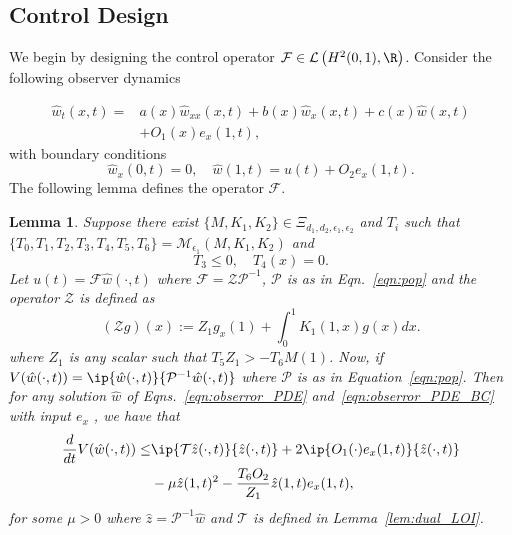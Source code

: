 \documentclass[US letter, 9 pt, conference]{ieeeconf}  \usepackage{setspace}
\newtheorem{lemma}{Lemma}
\newcommand{\igzo}{\int_0^1}
\newcommand{\wh}{\hat{w}}
\newcommand{\mcl}[1]{\mathcal{#1}}
\newcommand{\pop}{\mathcal{P}}
\newcommand{\pinv}{\mathcal{P}^{-1}}
\newcommand{\zh}{\hat{z}}
\begin{document}
\subsection{Control Design}
We begin by designing the control operator $\mcl{F} \in \mcl{L}\left(H^2(0,1),\R \right)$. Consider the following observer dynamics

\begin{align}
\wh_t(x,t)=&a(x)\wh_{xx}(x,t)+b(x)\wh_x(x,t)+c(x)\wh(x,t) \nonumber \\
&\label{eqn:obserror_PDE} +O_1(x)e_x(1,t),
\end{align}
with boundary conditions
\begin{equation}\label{eqn:obserror_PDE_BC}
\wh_x(0,t)=0, \quad \wh(1,t)=u(t)+O_2 e_x(1,t).
\end{equation} The following lemma defines the operator $\mcl{F}$.
\begin{lemma}\label{lem:control}
Suppose there exist $\{M,K_1,K_2\} \in \Xi_{d_1,d_2,\epsilon_1,\epsilon_2}$ and $T_i$ such that
$\{T_0,T_1,T_2,T_3,T_4,T_5,T_6\}=\mcl{M}_{\epsilon_1}\left(M,K_1,K_2\right)$ and
\[
 T_3 \leq 0, \quad  T_4(x)=0.
\]
Let $u(t)=\mcl{F}\wh(\cdot,t)$ where $\mcl{F}=\mcl{Z}\pinv$, $\pop$ is as in Eqn.~\eqref{eqn:pop} and the operator $\mcl{Z}$ is defined as
\[
\left(\mcl{Z}g \right)(x):=Z_1 g_x(1)+\igzo K_1(1,x)g(x)dx.
\]
where $Z_1$ is any scalar such that $T_5 Z_1> -T_6 M(1)$.
Now, if $V(\wh(\cdot,t))=\ip{\wh(\cdot,t)}{\pinv \wh(\cdot,t)}$ where $\pop$ is as in Equation~\eqref{eqn:pop}. Then for any solution $\wh$ of Eqns.~\eqref{eqn:obserror_PDE} and~\eqref{eqn:obserror_PDE_BC} with input $e_x$ , we have that
\begin{align*}
\frac{d}{dt}V(\wh(\cdot,t)) \leq & \ip{\mcl{T}\zh(\cdot,t)}{\zh(\cdot,t)}+2 \ip{O_1(\cdot)e_x(1,t)}{\zh(\cdot,t)} \\
& -\mu \zh(1,t)^2 -\frac{T_6 O_2}{Z_1}\zh(1,t)e_x(1,t),
\end{align*}
for some $\mu>0$ where $\hat z=\pinv \hat w$ and $\mcl{T}$ is defined in Lemma~\ref{lem:dual_LOI}.
\end{lemma}
\end{document}
